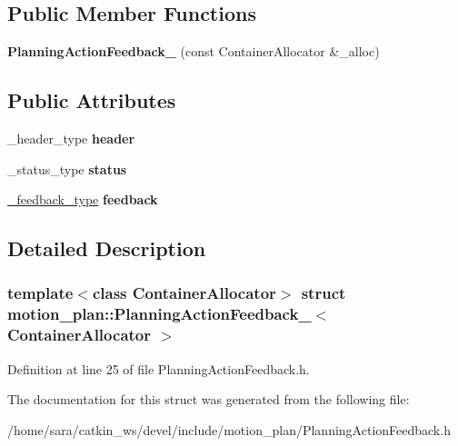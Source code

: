 \subsection*{Public Member Functions}
\begin{DoxyCompactItemize}
\item 
\mbox{\label{structmotion__plan_1_1PlanningActionFeedback___a8c449e1975dc1c315c202573b300a904}} 
{\bfseries Planning\+Action\+Feedback\+\_\+} (const Container\+Allocator \&\+\_\+alloc)
\end{DoxyCompactItemize}
\subsection*{Public Attributes}
\begin{DoxyCompactItemize}
\item 
\mbox{\label{structmotion__plan_1_1PlanningActionFeedback___a3338609c18cdfc5dce48d60d92c3bc27}} 
\+\_\+header\+\_\+type {\bfseries header}
\item 
\mbox{\label{structmotion__plan_1_1PlanningActionFeedback___a7cb88aea69ca3ea1df6ce8b0950d07ae}} 
\+\_\+status\+\_\+type {\bfseries status}
\item 
\mbox{\label{structmotion__plan_1_1PlanningActionFeedback___aa82bc396f707b24c1d6b5c13b0a4061a}} 
\hyperlink{structmotion__plan_1_1PlanningFeedback__}{\+\_\+feedback\+\_\+type} {\bfseries feedback}
\end{DoxyCompactItemize}


\subsection{Detailed Description}
\subsubsection*{template$<$class Container\+Allocator$>$\newline
struct motion\+\_\+plan\+::\+Planning\+Action\+Feedback\+\_\+$<$ Container\+Allocator $>$}



Definition at line 25 of file Planning\+Action\+Feedback.\+h.



The documentation for this struct was generated from the following file\+:\begin{DoxyCompactItemize}
\item 
/home/sara/catkin\+\_\+ws/devel/include/motion\+\_\+plan/Planning\+Action\+Feedback.\+h\end{DoxyCompactItemize}
